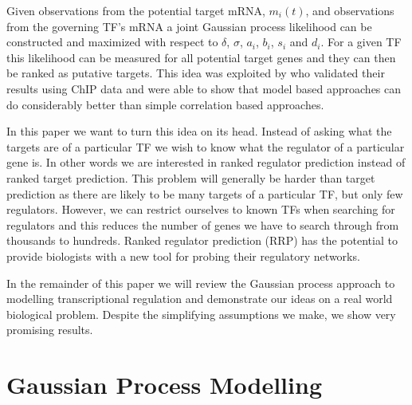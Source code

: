 \documentclass{article}
\begin{document}
Given  observations  from the  potential  target  mRNA, $m_i(t)$,  and
observations  from the  governing TF's  mRNA a  joint  Gaussian process
likelihood can be constructed  and maximized with respect to $\delta$,
$\sigma$,  $a_i$,  $b_i$,  $s_i$  and  $d_i$.  For  a  given  TF  this
likelihood can be measured for all potential target genes and they can
then  be ranked  as  putative  targets.  This  idea  was exploited  by
\cite{Honkela:modelbased10}  who validated  their  results using  ChIP
data  and  were  able to  show  that  model  based approaches  can  do
considerably better than simple correlation based approaches.

In this paper we want to turn this idea on its head. Instead of asking
what  the targets are  of a  particular TF  we wish  to know  what the
regulator of a particular gene is. In other words we are interested in
ranked regulator prediction instead  of ranked target prediction. This
problem will generally  be harder than target prediction  as there are
likely to be many targets of a particular TF, but only few regulators.
However, we  can restrict  ourselves to known  TFs when  searching for
regulators  and this reduces  the number  of genes  we have  to search
through from thousands to hundreds.  Ranked regulator prediction (RRP)
has the  potential to provide biologists  with a new  tool for probing
their regulatory networks.

In the  remainder of  this paper we  will review the  Gaussian process
approach to  modelling transcriptional regulation  and demonstrate our
ideas  on a  real world  biological problem.  Despite  the simplifying
assumptions we make, we show very promising results.

\section{Gaussian Process Modelling}
\end{document}
